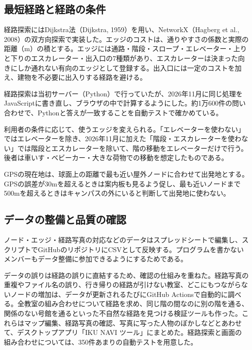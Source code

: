 \documentclass[
  paper=a4paper,
  fontsize=10.5pt,
  jafontsize=10.5pt,
  twocolumn,
  line_length=82.5mm,   %
  column_gap=5mm,
  gutter=20mm,          %
  number_of_lines=35,   %
  head_space=25mm,      %
  baselineskip=20.36pt, %
]{jlreq}
\begin{document}
\subsection{最短経路と経路の条件}

経路探索にはDijkstra法（Dijkstra, 1959）を用い、NetworkX（Hagberg et al., 2008）の双方向探索で実装した。エッジのコストは、通りやすさの係数と実際の距離（m）の積とする。エッジには通路・階段・スロープ・エレベーター・上りと下りのエスカレーター・出入口の7種類があり、エスカレーターは決まった向きにしか通れない有向のエッジとして登録する。出入口には一定のコストを加え、建物を不必要に出入りする経路を避ける。

経路探索は当初サーバー（Python）で行っていたが、2026年11月に同じ処理をJavaScriptに書き直し、ブラウザの中で計算するようにした。約1万600件の問い合わせで、Pythonと答えが一致することを自動テストで確かめている。

利用者の条件に応じて、使うエッジを変えられる。「エレベーターを使わない」ではエレベーターを除き、2026年11月に加えた「階段・エスカレーターを使わない」では階段とエスカレーターを除いて、階の移動をエレベーターだけで行う。後者は車いす・ベビーカー・大きな荷物での移動を想定したものである。

GPSの現在地は、球面上の距離で最も近い屋外ノードに合わせて出発地とする。GPSの誤差が30mを超えるときは案内板も見るよう促し、最も近いノードまで500mを超えるときはキャンパスの外にいると判断して出発地に使わない。

\subsection{データの整備と品質の確認}

ノード・エッジ・経路写真の対応などのデータはスプレッドシートで編集し、スクリプトでGitHubのリポジトリにCSVとして反映する。プログラムを書かないメンバーもデータ整備に参加できるようにするためである。

データの誤りは経路の誤りに直結するため、確認の仕組みを重ねた。経路写真の重複やファイル名の誤り、行き帰りの経路が引けない教室、どこにもつながらないノードの増加は、データが更新されるたびにGitHub Actionsで自動的に調べる。全教室の組み合わせについて経路を求め、同じ階の間なのに別の階を通る、関係のない号館を通るといった不自然な経路を見つける検証ツールも作った。これらはマップ編集、経路写真の確認、写真に写った人物のぼかしなどとあわせて、デスクトップアプリ「IKU NAVI ツール」にまとめた。経路探索と画面の組み合わせについては、350件あまりの自動テストを用意した。

\end{document}
